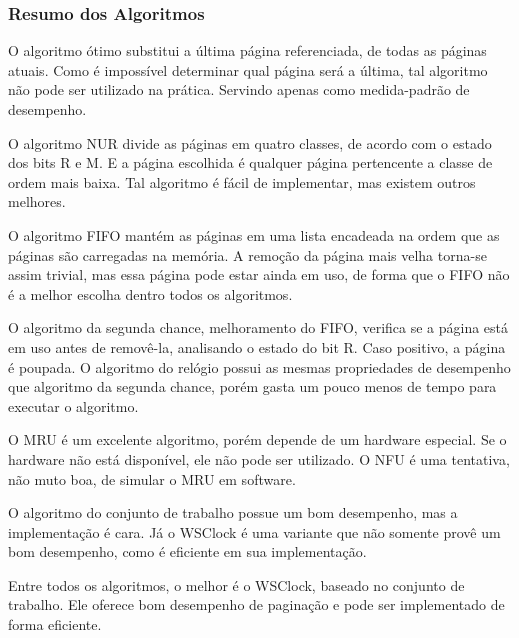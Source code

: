 \subsubsection{Resumo dos Algoritmos}

O algoritmo ótimo substitui a última página referenciada, de todas as páginas atuais. Como é impossível determinar qual página será a última, tal algoritmo não pode ser utilizado na prática. Servindo apenas como medida-padrão de desempenho.

O algoritmo NUR divide as páginas em quatro classes, de acordo com o estado dos bits R e M. E a página escolhida é qualquer página pertencente a classe de ordem mais baixa. Tal algoritmo é fácil de implementar, mas existem outros melhores.

O algoritmo FIFO mantém as páginas em uma lista encadeada na ordem que as páginas são carregadas na memória. A remoção da página mais velha torna-se assim trivial, mas essa página pode estar ainda em uso, de forma que o FIFO não é a melhor escolha dentro todos os algoritmos.

O algoritmo da segunda chance, melhoramento do FIFO, verifica se a página está em uso antes de removê-la, analisando o estado do bit R. Caso positivo, a página é poupada. O algoritmo do relógio possui as mesmas propriedades de desempenho que algoritmo da segunda chance, porém gasta um pouco menos de tempo para executar o algoritmo.

O MRU é um excelente algoritmo, porém depende de um hardware especial. Se o hardware não está disponível, ele não pode ser utilizado. O NFU é uma tentativa, não muto boa, de simular o MRU em software.

O algoritmo do conjunto de trabalho possue um bom desempenho, mas a implementação é cara. Já o WSClock é uma variante que não somente provê um bom desempenho, como é eficiente em sua implementação.

Entre todos os algoritmos, o melhor é o WSClock, baseado no conjunto de trabalho. Ele oferece bom desempenho de paginação e pode ser implementado de forma eficiente.





